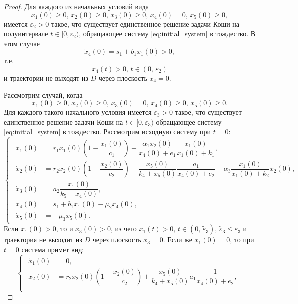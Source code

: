 \documentclass[14pt,a4paper]{extarticle}
\begin{document}
\begin{proof}
		Для каждого из начальных условий вида
		\begin{equation*}
			x_1(0)\ge0,\, x_2(0)\ge0,\, x_3(0)\ge0,\, x_4(0)=0,\, x_5(0)\ge0,
		\end{equation*}
		имеется $\varepsilon_2>0$ такое, что существует единственное решение задачи Коши на полуинтервале $t\in[0,\varepsilon_2)$, обращающее систему \ref{eq:initial_system} в тождество. В этом случае 
		\[\dot{x}_4(0)=s_1+b_1x_1(0)>0,\]
		т.е. 
		\[x_4(t)>0,\, t\in(0,\,\varepsilon_2)\]
		и траектории не выходят из $D$ через плоскость $x_4=0$.
		
		Рассмотрим случай, когда
		\begin{equation}\label{eq:conds_3}
			x_1(0)\ge0,\, x_2(0)\ge0,\, x_3(0)=0,\, x_4(0)\ge0,\, x_5(0)\ge0.
		\end{equation}
		Для каждого такого начального условия имеется $\varepsilon_3>0$ такое, что существует единственное решение задачи Коши на $t\in[0,\varepsilon_3)$ обращающее систему \ref{eq:initial_system} в тождество. Рассмотрим исходную систему при $t=0$:
		\begin{equation*}
			\begin{cases}
				\begin{aligned}
					\dot{x}_1(0) &= r_1x_1(0)\left(1-\dfrac{x_1(0)}{c_1}\right)-\dfrac{\alpha_1x_2(0)}{x_4(0)+e_1}\dfrac{x_1(0)}{x_1(0)+k_1},\\
					\dot{x}_2(0) &= r_2x_2(0)\left(1-\dfrac{x_2(0)}{c_2}\right)+\dfrac{x_5(0)}{k_4+x_5(0)}\dfrac{a_1}{x_4(0)+e_2}-\alpha_3\dfrac{x_1(0)}{x_1(0)+k_2}x_2(0),\\
					\dot{x}_3(0) &= a_2\dfrac{x_1(0)}{k_5+x_4(0)},\\
					\dot{x}_4(0) &= s_1 + b_1x_1(0)-\mu_2x_4(0),\\
					\dot{x}_5(0) &= -\mu_3x_5(0).
				\end{aligned}
			\end{cases}
		\end{equation*}
		Если $x_1(0)>0$, то и $\dot{x}_3(0)>0$, из чего $x_1(t)>0,\, t\in(0,\, \tilde{\varepsilon}_3),\,\tilde{\varepsilon}_3\le\varepsilon_3$ и траектория не выходит из $D$ через плоскость $x_3=0$. Если же $x_1(0)=0$, то при $t=0$ система примет вид:
		\begin{equation*}
			\begin{cases}
				\begin{aligned}
					\dot{x}_1(0) &= 0,\\
					\dot{x}_2(0) &= r_2x_2(0)\left(1-\dfrac{x_2(0)}{c_2}\right)+\dfrac{x_5(0)}{k_4+x_5(0)}a_1\dfrac{1}{x_4(0)+e_2},\\

\end{aligned}
\end{cases}
\end{equation*}
\end{proof}
\end{document}

